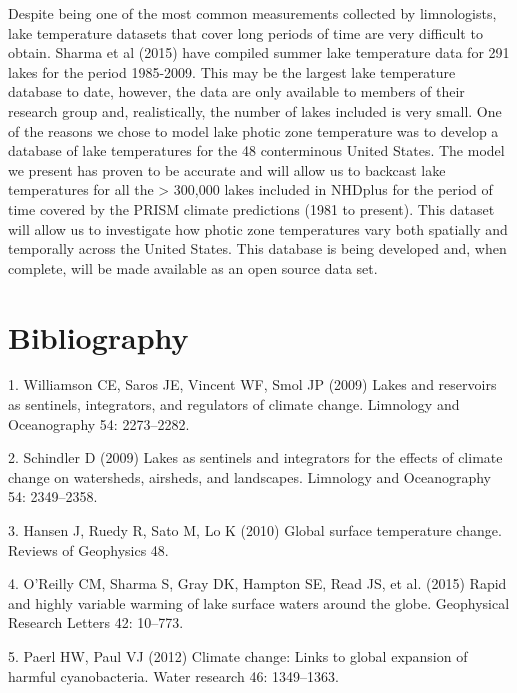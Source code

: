 \documentclass[
]{article}
\begin{document}
Despite being one of the most common measurements collected by
limnologists, lake temperature datasets that cover long periods of time
are very difficult to obtain. Sharma et al (2015) have compiled summer
lake temperature data for 291 lakes for the period 1985-2009. This may
be the largest lake temperature database to date, however, the data are
only available to members of their research group and, realistically,
the number of lakes included is very small. One of the reasons we chose
to model lake photic zone temperature was to develop a database of lake
temperatures for the 48 conterminous United States. The model we present
has proven to be accurate and will allow us to backcast lake
temperatures for all the \textgreater{} 300,000 lakes included in
NHDplus for the period of time covered by the PRISM climate predictions
(1981 to present). This dataset will allow us to investigate how photic
zone temperatures vary both spatially and temporally across the United
States. This database is being developed and, when complete, will be
made available as an open source data set.

\hypertarget{bibliography}{%
\section*{Bibliography}\label{bibliography}}

\hypertarget{refs}{}
\leavevmode\hypertarget{ref-williamson2009lakes}{}%
1. Williamson CE, Saros JE, Vincent WF, Smol JP (2009) Lakes and
reservoirs as sentinels, integrators, and regulators of climate change.
Limnology and Oceanography 54: 2273--2282.

\leavevmode\hypertarget{ref-schindler2009lakes}{}%
2. Schindler D (2009) Lakes as sentinels and integrators for the effects
of climate change on watersheds, airsheds, and landscapes. Limnology and
Oceanography 54: 2349--2358.

\leavevmode\hypertarget{ref-hansen2010global}{}%
3. Hansen J, Ruedy R, Sato M, Lo K (2010) Global surface temperature
change. Reviews of Geophysics 48.

\leavevmode\hypertarget{ref-o2015rapid}{}%
4. O'Reilly CM, Sharma S, Gray DK, Hampton SE, Read JS, et al. (2015)
Rapid and highly variable warming of lake surface waters around the
globe. Geophysical Research Letters 42: 10--773.

\leavevmode\hypertarget{ref-paerl2012climate}{}%
5. Paerl HW, Paul VJ (2012) Climate change: Links to global expansion of
harmful cyanobacteria. Water research 46: 1349--1363.
\end{document}
